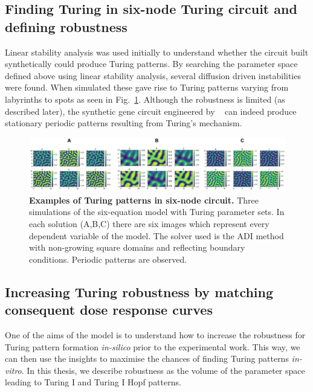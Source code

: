 \subsection{Finding Turing in six-node Turing circuit and defining robustness}
Linear stability analysis was used initially to understand whether the circuit built synthetically could produce Turing patterns.
By searching the parameter space defined above using linear stability analysis,
several diffusion driven instabilities were found.
When simulated these gave rise to Turing patterns
varying from labyrinths to spots as seen in Fig.~\ref{fig:square_turing}.
Although the robustness is limited (as described later),
the synthetic gene circuit engineered by ~\cite{Tica2020} can indeed produce stationary periodic patterns
resulting from Turing's mechanism.

\begin{figure}[H]
    \centering
    \includegraphics[width=1\textwidth]{chapters/Chapter 2/square_turing}
    \caption{\textbf{Examples of Turing patterns in six-node circuit.} Three simulations of the six-equation model with Turing parameter sets.
    In each solution (A,B,C) there are six images which represent every dependent variable of the model.
    The solver used is the \acrfull{ADI} method with non-growing square domains and reflecting boundary conditions.
    Periodic patterns are observed. }
    \label{fig:square_turing}
\end{figure}

\subsection{Increasing Turing robustness by matching consequent dose response curves}\label{balancing}
One of the aims of the model is
to understand
how to increase the robustness for Turing pattern formation \textit{in-silico} prior to the experimental work.
This way, we can then use the insights to maximise the chances of finding Turing patterns \textit{in-vitro}.
In this thesis,
we describe robustness as the volume of the parameter space leading to Turing I and Turing I Hopf patterns.

